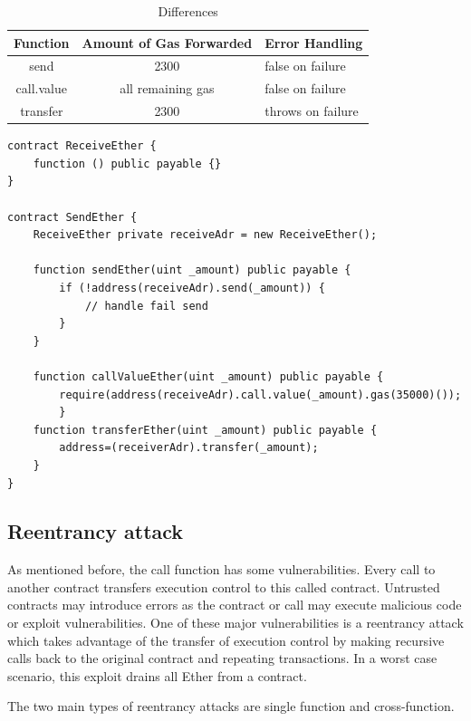 \documentclass[sigconf]{acmart}
\begin{document}
\begin{table}
  \caption{Differences}
  \label{tab:freq}
  \begin{tabular}{ccl}
    \toprule
    Function & Amount of Gas Forwarded & Error Handling\\
    \midrule
    send&2300& false on failure\\
    call.value & all remaining gas& false on failure\\
    transfer & 2300 & throws on failure\\
  \bottomrule
\end{tabular}
\end{table}

\begin{lstlisting}[language=Solidity, caption=Ether exchange,label={lst:exchange}]
contract ReceiveEther {
    function () public payable {}
}

contract SendEther {
    ReceiveEther private receiveAdr = new ReceiveEther();
    
    function sendEther(uint _amount) public payable {
        if (!address(receiveAdr).send(_amount)) {
            // handle fail send
        }
    }
    
    function callValueEther(uint _amount) public payable {
        require(address(receiveAdr).call.value(_amount).gas(35000)());
        }
    function transferEther(uint _amount) public payable {
        address=(receiverAdr).transfer(_amount);
    }
}
\end{lstlisting}


\subsection{Reentrancy attack}
As mentioned before, the call function has some vulnerabilities. Every call to another contract transfers execution control to this called contract. Untrusted contracts may introduce errors as the contract or call may execute malicious code or exploit vulnerabilities. One of these major vulnerabilities is a reentrancy attack which takes advantage of the transfer of execution control by making recursive calls back to the original contract and repeating transactions. In a worst case scenario, this exploit drains all Ether from a contract. 

The two main types of reentrancy attacks are single function and cross-function.
\end{document}
